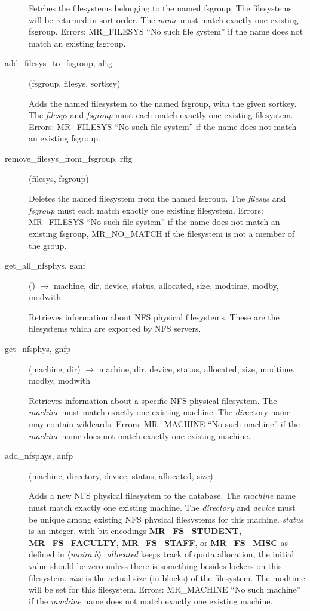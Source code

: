 \begin{description}
Fetches the filesystems belonging to the named fsgroup.  The
filesystems will be returned in sort order.  The {\em name} must match
exactly one existing fsgroup.  Errors: MR\_FILESYS ``No such file
system'' if the name does not match an existing fsgroup.

\item[add\_filesys\_to\_fsgroup, aftg](fsgroup, filesys, sortkey)

Adds the named filesystem to the named fsgroup, with the given
sortkey.  The {\em filesys} and {\em fsgroup} must each match exactly one
existing filesystem.  Errors: MR\_FILESYS ``No such file system'' if the
name does not match an existing fsgroup.

\item[remove\_filesys\_from\_fsgroup, rffg](filesys, fsgroup)

Deletes the named filesystem from the named fsgroup.  The {\em filesys}
and {\em fsgroup} must each match exactly one existing filesystem.
Errors: MR\_FILESYS ``No such file system'' if the name does not match
an existing fsgroup, MR\_NO\_MATCH if the filesystem is not a member of
the group.

\item[get\_all\_nfsphys, ganf]() $\rightarrow$ machine, dir, device, status,
allocated, size, modtime, modby, modwith

Retrieves information about NFS physical filesystems.  These are the
filesystems which are exported by NFS servers.

\item[get\_nfsphys, gnfp](machine, dir) $\rightarrow$ machine, dir, device,
status, allocated, size, modtime, modby, modwith

Retrieves information about a specific NFS physical filesystem.  The
{\em machine} must match exactly one existing machine.  The
{\em dir}ectory name may contain wildcards.  Errors: MR\_MACHINE ``No
such machine'' if the {\em machine} name does not match exactly one
existing machine.

\item[add\_nfsphys, anfp](machine, directory, device, status, allocated,
size)

Adds a new NFS physical filesystem to the database.  The {\em machine}
name must match exactly one existing machine.  The {\em directory} and
{\em device} must be unique among existing NFS physical filesystems for
this machine.  {\em status} is an integer, with bit encodings
{\bf MR\_FS\_STUDENT, MR\_FS\_FACULTY, MR\_FS\_STAFF}, or {\bf MR\_FS\_MISC}
as defined in {\em $\langle$moira.h$\rangle$}.  {\em allocated} keeps track of quota
allocation, the initial value should be zero unless there is something
besides lockers on this filesystem.  {\em size} is the actual size (in
blocks) of the filesystem.  The modtime will be set for this
filesystem.  Errors: MR\_MACHINE ``No such machine'' if the {\em machine}
name does not match exactly one existing machine.


\end{description}
